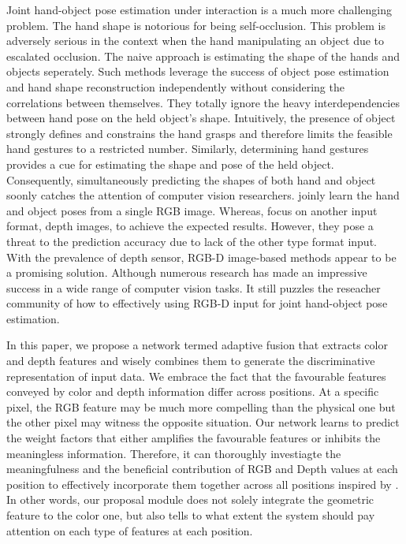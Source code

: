 Joint hand-object pose estimation under interaction is a much more challenging problem. The hand shape is notorious for being self-occlusion. This problem is adversely serious in the context when the hand manipulating an object due to escalated occlusion. The naive approach is estimating the shape of the hands and objects seperately. Such methods leverage the success of object pose estimation and hand shape reconstruction independently without considering the correlations between themselves. They totally ignore the heavy interdependencies between hand pose on the held object's shape. Intuitively, the presence of object strongly defines and constrains the hand grasps and therefore limits the feasible hand gestures to a restricted number. Similarly, determining hand gestures provides a cue for estimating the shape and pose of the held object. Consequently, simultaneously predicting the shapes of both hand and object soonly catches the attention of computer vision researchers.  \cite{hasson2019learning, hasson2020leveraging, tekin2019h+, tse2022collaborative, liu2021semi, oikonomidis2011full, lu2021understanding, hasson2021towards, wang2020learning} joinly learn the hand and object poses from a single RGB image. Whereas, \cite{choi2017robust, zhang2021single, goudie20173d, oberweger2019generalized} focus on another input format, depth images, to achieve the expected results. However, they pose a threat to the prediction accuracy due to lack of the other type format input. With the prevalence of depth sensor, RGB-D image-based methods \cite{kyriazis2013physically, tsoli2018joint} appear to be a promising solution. Although numerous research has made an impressive success in a wide range of computer vision tasks. It still puzzles the reseacher community of how to effectively using RGB-D input for joint hand-object pose estimation.

In this paper, we propose a network termed adaptive fusion that extracts color and depth features and wisely combines them to generate the discriminative representation of input data. We embrace the fact that the favourable features conveyed by color and depth information differ across positions. At a specific pixel, the RGB feature may be much more compelling than the physical one but the other pixel may witness the opposite  situation. Our network learns to predict the weight factors that either amplifies the favourable features or inhibits the meaningless information. Therefore, it can thoroughly investiagte the meaningfulness and the beneficial contribution of RGB and Depth values at each position to effectively incorporate them together across all positions inspired by \cite{wang2019densefusion}. In other words, our proposal module does not solely integrate the geometric feature to the color one, but also tells to what extent the system should pay attention on each type of features at each position. 

